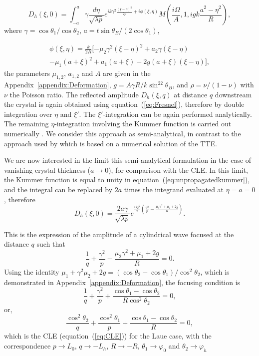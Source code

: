 \documentclass[preprint]{iucr}              %
\begin{document}
\begin{equation}
\label{eq:unpropagatedkummer}
    D_h(\xi,0) = 
    \int_{-a}^{a} \gamma\frac{d\eta}{\sqrt{\lambda p}}
    e^{i k \gamma^2
    \frac{(\xi-\eta)^2}{2p}+i \phi(\xi,\eta)
    }
     M(\frac{i\Omega}{A},1,i g k \frac{a^2-\eta^2}{R}),
\end{equation}
where $\gamma=\cos\theta_1/\cos\theta_2$, $a=t \sin\theta_B/(2\cos\theta_1)$,


\begin{multline}
    \phi(\xi,\eta) =\frac{k}{2R}[-\mu_2\gamma^2(\xi-\eta)^2
    +a_2\gamma(\xi-\eta) \\
    -\mu_1(a+\xi)^2 
    +a_1(a+\xi)
    -2g(a+\xi)(\xi-\eta)],
\end{multline}
the parameters $\mu_{1,2}$, $a_{1,2}$ and $A$ are given in the Appendix~\ref{appendix:Deformation},
$g=A\gamma R/ k \sin^22\theta_B$,
and $\rho=\nu/(1-\nu)$ with $\nu$ the Poisson ratio.   
The reflected amplitude $D_h(\xi,q)$ at distance $q$ downstream the crystal is again obtained using equation~(\ref{eq:Fresnel}), therefore by double integration over $\eta$ and $\xi'$. The $\xi'$-integration can be again performed analytically. The remaining $\eta$-integration involving the Kummer function is carried out numerically \cite{GuigayFerrero2016}. We consider this approach as semi-analytical, in contrast to the approach used by \cite{Nesterets} which is based on a numerical solution of the TTE.

We are now interested in the limit this semi-analytical formulation in the case of vanishing crystal thickness ($a\rightarrow0{}$), for comparison with the CLE. In this limit, the Kummer function is equal to unity in equation~(\ref{eq:unpropagatedkummer}), and the integral can be replaced by $2a$ times the integrand evaluated at $\eta=a=0$, therefore
\begin{equation}
\label{eq:14reduced}
    D_h(\xi,0) = \frac{2 a \gamma}{\sqrt{\lambda p}} e^{\frac{i k \xi^2}{2}(\frac{\gamma^2}{p}-\frac{\mu_2\gamma^2+\mu_1+2g}{R})}.
\end{equation}

This is the expression of the amplitude of a cylindrical wave focused at the distance $q$ such that
\begin{equation}
    \frac{1}{q}+\frac{\gamma^2}{p}-\frac{\mu_2\gamma^2+\mu_1+2g}{R}=0. 
\end{equation}
Using the identity $\mu_1+\gamma^2\mu_2+2g=(\cos\theta_2-\cos\theta_1)/\cos^2\theta_2$, which is demonstrated in Appendix~\ref{appendix:Deformation}, the focusing condition is 
\begin{equation}
    \frac{1}{q}+\frac{\gamma^2}{p}+\frac{\cos\theta_1-\cos\theta_2}{R\cos^2\theta_2}=0,
\end{equation}
or,
\begin{equation}
    \frac{\cos^2\theta_2}{q}+\frac{\cos^2\theta_1}{p}+\frac{\cos\theta_1-\cos\theta_2}{R}=0,
\end{equation}
which is the CLE (equation~(\ref{eq:CLE})) for the Laue case, with the correspondence $p \rightarrow L_0$, $q \rightarrow -L_h$, $R \rightarrow -R$, $\theta_1 \rightarrow \varphi_0$ and $\theta_2 \rightarrow \varphi_h$
\end{document}
